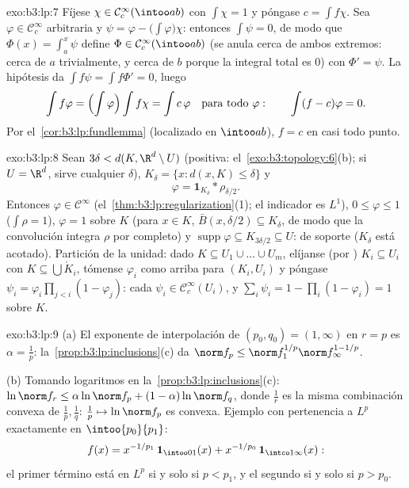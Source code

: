 \begin{solution}{exo:b3:lp:7}
Fíjese $\chi \in \mathcal C_c^\infty(\intoo ab)$ con $\int\chi =
1$ y póngase $c = \int f\chi$. Sea $\varphi \in \mathcal
C_c^\infty$ arbitraria y $\psi = \varphi -
\bigl(\int\varphi\bigr)\chi$: entonces $\int\psi = 0$, de modo que
$\Phi(x)
= \int_a^x\psi$ define $\Phi \in \mathcal C_c^\infty(\intoo
ab)$ (se anula cerca de ambos extremos: cerca de $a$ trivialmente, y
cerca de $b$ porque la integral total es $0$) con $\Phi' = \psi$. La
hipótesis da $\int f\psi = \int f\Phi' = 0$, luego
\[
\int f\varphi = \Bigl(\int\varphi\Bigr)\int f\chi = \int
c\,\varphi
\quad\text{para todo } \varphi:
\qquad \int(f - c)\varphi = 0 .
\]
Por el~\cref{cor:b3:lp:fundlemma} (localizado en $\intoo ab$), $f =
c$ en casi todo punto.
\end{solution}

\begin{solution}{exo:b3:lp:8}
Sean $3\delta < d(K, \R^d\setminus U)$ (positiva:
el~\cref{exo:b3:topology:6}(b); si $U = \R^d$, sirve cualquier
$\delta$), $K_\delta = \{x : d(x, K) \leq \delta\}$ y
\[
\varphi = \mathbf 1_{K_\delta} * \rho_{\delta/2} .
\]
Entonces $\varphi \in \mathcal C^\infty$
(el~\cref{thm:b3:lp:regularization}(1); el indicador es $L^1$),
$0 \leq \varphi \leq 1$ ($\int\rho = 1$), $\varphi = 1$ sobre $K$ (para
$x \in K$, $\bar B(x, \delta/2) \subseteq K_\delta$, de modo que la
convolución integra $\rho$ por completo) y
$\operatorname{supp}\varphi \subseteq K_{3\delta/2} \subseteq
U$: de soporte  ($K_\delta$ está acotado). Partición de la
unidad: dado $K \subseteq U_1\cup\dots\cup U_m$, elíjanse (por
) 
$K_i \subseteq U_i$ con $K \subseteq
\bigcup \mathring K_i$, tómense $\varphi_i$ como arriba para $(K_i,
U_i)$ y póngase $\psi_i = \varphi_i\prod_{j <i}(1 -
\varphi_j)$: cada $\psi_i \in \mathcal C_c^\infty(U_i)$, y
$\sum_i\psi_i = 1 - \prod_i(1 - \varphi_i) = 1$ sobre $K$.
\end{solution}

\begin{solution}{exo:b3:lp:9}
(a) El exponente de interpolación de $(p_0, q_0) = (1, \infty)$ en
$r = p$ es $\alpha = \frac1p$: la~\cref{prop:b3:lp:inclusions}(c) da
$\norm f_p \leq \norm
f_1^{1/p}\norm f_\infty^{1 - 1/p}$.

(b) Tomando logaritmos en la~\cref{prop:b3:lp:inclusions}(c):
$\ln\norm f_r \leq
\alpha\ln\norm f_p + (1-\alpha)\ln\norm f_q$, donde $\frac1r$ es la
misma combinación convexa de $\frac1p, \frac1q$: $\frac1p
\mapsto \ln\norm f_p$ es convexa. Ejemplo con pertenencia a $L^p$
exactamente en $\intoo{p_0}{p_1}$:
\[
f(x) = x^{-1/p_1}\,\mathbf 1_{\intoo01}(x) +
x^{-1/p_0}\,\mathbf 1_{\intco1\infty}(x):
\]
el primer término está en $L^p$ si y solo si $p < p_1$, y el segundo si
y solo si $p >
p_0$.
\end{solution}


